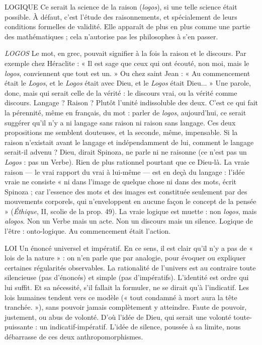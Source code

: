 {LOGIQUE Ce serait la science de la raison ({\it logos}), si une telle science était
possible. À défaut, c’est l'étude des raisonnements, et spécialement
de leurs conditions formelles de validité. Elle apparaît de plus en plus
comme une partie des mathématiques ; cela n’autorise pas les philosophes à
s’en passer.

{\it LOGOS} Le mot, en grec, pouvait signifier à la fois la raison et le discours.
Par exemple chez Héraclite : « Il est sage que ceux qui ont écouté,
non moi, mais le {\it logos}, conviennent que tout est un. » Ou chez saint Jean : « Au
commencement était le {\it Logos}, et le {\it Logos} était avec Dieu, et le {\it Logos} était
Dieu... » Une parole, donc, mais qui serait celle de la vérité : le discours vrai,
ou la vérité comme discours. Langage ? Raison ? Plutôt l’unité indissoluble des
deux. C’est ce qui fait la pérennité, même en français, du mot : parler de {\it logos},
aujourd’hui, ce serait suggérer qu’il n’y a ni langage sans raison ni raison sans
langage. Ces deux propositions me semblent douteuses, et la seconde, même,
impensable. Si la raison n’existait avant le langage et indépendamment de lui,
comment le langage serait-il advenu ? Dieu, dirait Spinoza, ne parle ni ne raisonne
(ce n’est pas un {\it Logos} : pas un Verbe). Rien de plus rationnel pourtant
que ce Dieu-là. La vraie raison — le vrai rapport du vrai à lui-même — est en
deçà du langage : l’idée vraie ne consiste « ni dans l’image de quelque chose ni
dans des mots, écrit Spinoza ; car l’essence des mots et des images est constituée
seulement par des mouvements corporels, qui n’enveloppent en aucune façon
le concept de la pensée » ({\it Éthique}, II, scolie de la prop. 49). La vraie logique est
muette : non {\it logos}, mais {\it alogos}. Non un Verbe mais un acte. Non un discours
mais un silence. Logique de l’être : onto-logique. Au commencement était
l'action.

LOI Un énoncé universel et impératif. En ce sens, il est clair qu’il n’y a pas
de « lois de la nature » : on n’en parle que par analogie, pour évoquer
ou expliquer certaines régularités observables. La rationalité de l’univers est au
contraire toute silencieuse (pas d’énoncés) et simple (pas d’impératifs). L’identité
est ordre qui lui suffit. Et sa nécessité, s’il fallait la formuler, ne se dirait
qu’à l’indicatif. Les lois humaines tendent vers ce modèle (« tout condamné à
mort aura la tête tranchée. »), sans pouvoir jamais complètement y atteindre.
Faute de pouvoir, justement, ou abus de volonté. D’où l’idée de Dieu, qui
serait une volonté toute-puissante : un indicatif-impératif. L'idée de silence,
poussée à sa limite, nous débarrasse de ces deux anthropomorphismes.

}
